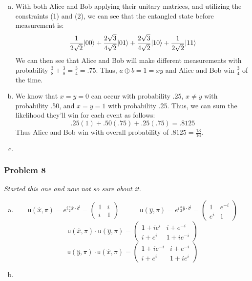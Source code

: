 \documentclass[a4paper,11pt]{article}
\begin{document}
\begin{enumerate}[a)]
    \item With both Alice and Bob applying their unitary matrices, and utilizing the constraints (1) and (2), we can see that the entangled state before measurement is:
        $$\frac{1}{2\sqrt{2}}{\left\vert{00}\right\rangle}+\frac{2\sqrt{3}}{4\sqrt{2}}{\left\vert{01}\right\rangle}+\frac{2\sqrt{3}}{4\sqrt{2}}{\left\vert{10}\right\rangle}+\frac{1}{2\sqrt{2}}{\left\vert{11}\right\rangle}$$
        We can then see that Alice and Bob will make different measurements with probability $\frac{3}{8}+\frac{3}{8}=\frac{3}{4}=.75$. Thus, $a\oplus b = 1=xy$ and Alice and Bob win $\frac{3}{4}$ of the time.
    \item We know that $x=y=0$ can occur with probability .25, $x\neq y$ with probability .50, and $x=y=1$ with probability .25. Thus, we can sum the likelihood they'll win for each event as follows:
        $$.25(1)+.50(.75)+.25(.75)=.8125$$
        Thus Alice and Bob win with overall probability of $.8125=\frac{13}{16}$.
    \item
\end{enumerate}
\subsubsection*{Problem 8}
\emph{\color{red} Started this one and now not so sure about it.}
\begin{enumerate}[a)]
\item $$\mathsf{u}(\hat{x},\pi)=e^{i\frac{\pi}{2}\bar{x}\cdot\vec{\sigma}}=\left(\begin{array}{cc} 1 & i \\ i & 1 \end{array}\right)\quad\quad\quad\mathsf{u}(\hat{y},\pi)=e^{i\frac{\pi}{2}\bar{y}\cdot\vec{\sigma}}=\left(\begin{array}{cc} 1 & e^{-i} \\ e^i & 1 \end{array}\right)$$
    $$\mathsf{u}(\hat{x},\pi)\cdot\mathsf{u}(\hat{y},\pi)=\left(\begin{array}{cc} 1+ie^i & i+e^{-i} \\ i+e^i & 1+ie^{-i} \end{array}\right)$$
    $$\mathsf{u}(\hat{y},\pi)\cdot\mathsf{u}(\hat{x},\pi)=\left(\begin{array}{cc} 1+ie^{-i} & i+e^{-i} \\ i+e^i & 1+ie^{i} \end{array}\right)$$
    \item
\end{enumerate}
\end{document}
